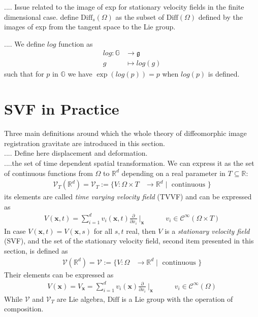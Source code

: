 .... Issue related to the image of exp for stationary velocity fields in the finite dimensional case. define $\text{Diff}_{s}(\Omega)$ as the subset of $\text{Diff}(\Omega)$ defined by the images of exp from the tangent space to the Lie group.


.... We define $log$ function as
\begin{align*}
log : \mathbb{G} & \longrightarrow  \mathfrak{g}    \\
g &\longmapsto log(g)
\end{align*}
such that for $p$ in $\mathbb{G}$ we have $\exp(log(p)) = p$ when $log(p)$ is defined.



\section{SVF in Practice}

Three main definitions around which the whole theory of diffeomorphic image registration gravitate are introduced in this section. \\
.... Define here displacement and deformation.\\
....the set of time dependent spatial transformation. We can express it as the set of continuous functions from $\Omega$ to $\mathbb{R}^{d}$ depending on a real parameter in $T\subseteq \mathbb{R}$:
\begin{align*}
\mathcal{V}_{T}(\mathbb{R}^{d}) = \mathcal{V}_{T} := \lbrace V : \Omega \times T &\longrightarrow \mathbb{R}^d \mid \text{ continuous } \rbrace 
\end{align*}
its elements are called \emph{time varying velocity field} (TVVF) and can be expressed as
\begin{align*}
V(\mathbf{x},t) = \sum_{i=1}^{d} v_{i}(\mathbf{x},t) \frac{\partial}{\partial x_{i}}~\Bigr|_{\mathbf{x}} 
\qquad 
\quad 
v_{i} \in \mathcal{C}^{\infty} (\Omega \times T)
\end{align*}
In case $V(\mathbf{x},t) = V(\mathbf{x},s)$ for all $s,t$ real, then $V$ is a \emph{stationary velocity field} (SVF), and the set of the stationary velocity field, second item presented in this section, is defined as
\begin{align*}
\mathcal{V}(\mathbb{R}^{d}) = \mathcal{V} := \lbrace V : \Omega &\longrightarrow \mathbb{R}^d \mid \text{ continuous } \rbrace 
\end{align*}
Their elements can be expressed as 
\begin{align*}
V(\mathbf{x}) = V_{\mathbf{x}} = \sum_{i=1}^{d} v_{i}(\mathbf{x}) \frac{\partial}{\partial x_{i}}~\Bigr|_{\mathbf{x}} \qquad \quad v_{i} \in \mathcal{C}^{\infty} (\Omega)
\end{align*}
While $\mathcal{V}$ and $\mathcal{V}_{T}$ are Lie algebra, $\text{Diff}$ is a Lie group with the operation of composition.\\

